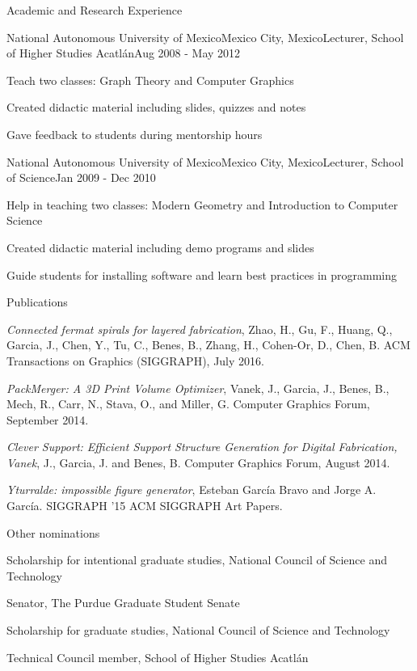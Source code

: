 \documentclass{resume} %
\begin{document}
\begin{rSection}{Academic and Research Experience}
	\begin{rSubsection}{National Autonomous University of Mexico}{Mexico City, Mexico}{Lecturer, School of Higher Studies Acatl\'{a}n}{Aug 2008 - May 2012}
	\item Teach two classes: Graph Theory and Computer Graphics
	\item Created didactic material including slides, quizzes and notes
	\item Gave feedback to students during mentorship hours
	\end{rSubsection}
	
	\begin{rSubsection}{National Autonomous University of Mexico}{Mexico City, Mexico}{Lecturer, School of Science}{Jan 2009 - Dec 2010}
	\item Help in teaching two classes: Modern Geometry and Introduction to Computer Science
	\item Created didactic material including demo programs and slides
	\item Guide students for installing software and learn best practices in programming
	\end{rSubsection}

\end{rSection}


\begin{rSection}{Publications} \itemsep -4pt
\item \textit{Connected fermat spirals for layered fabrication}, Zhao, H., Gu, F., Huang, Q., Garcia, J., Chen, Y., Tu, C., Benes, B., Zhang, H., Cohen-Or, D., Chen, B. ACM Transactions on Graphics (SIGGRAPH), July 2016.
\item \textit{PackMerger: A 3D Print Volume Optimizer}, Vanek, J., Garcia, J., Benes, B., Mech, R., Carr, N., Stava, O., and Miller, G. Computer Graphics Forum, September 2014.
\item \textit{Clever Support: Efficient Support Structure Generation for Digital Fabrication, Vanek}, J., Garcia, J. and Benes, B. Computer Graphics Forum, August 2014.
\item \textit{Yturralde: impossible figure generator}, Esteban Garc\'{i}a Bravo and Jorge A. Garc\'{i}a. SIGGRAPH '15 ACM SIGGRAPH Art Papers.
\end{rSection}

\begin{rSection}{Other nominations} \itemsep -8pt
\item Scholarship for intentional graduate studies, National Council of Science and Technology
\item Senator, The Purdue Graduate Student Senate
\item Scholarship for graduate studies, National Council of Science and Technology
\item Technical Council member, School of Higher Studies Acatl\'{a}n
\end{rSection}
\end{document}
